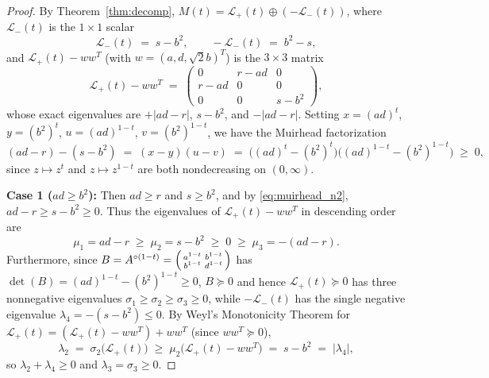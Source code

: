 \documentclass[11pt,a4paper]{article}
\theoremstyle{plain}
\theoremstyle{definition}
\theoremstyle{remark}
\begin{document}
\begin{proof}
By Theorem~\ref{thm:decomp}, $M(t) = \mathcal{L}_+(t) \oplus (-\mathcal{L}_-(t))$, where $\mathcal{L}_-(t)$ is the $1 \times 1$ scalar
\[
  \mathcal{L}_-(t) \;=\; s - b^2, \qquad -\mathcal{L}_-(t) \;=\; b^2 - s,
\]
and $\mathcal{L}_+(t) - w w^T$ (with $w = (a, d, \sqrt{2}b)^T$) is the $3 \times 3$ matrix
\[
  \mathcal{L}_+(t) - w w^T \;=\; \begin{pmatrix} 0 & r - ad & 0 \\ r - ad & 0 & 0 \\ 0 & 0 & s - b^2 \end{pmatrix},
\]
whose exact eigenvalues are $+|ad - r|$, $s - b^2$, and $-|ad - r|$. Setting $x = (ad)^t$, $y = (b^2)^t$, $u = (ad)^{1-t}$, $v = (b^2)^{1-t}$, we have the Muirhead factorization
\begin{equation}\label{eq:muirhead_n2}
  (ad - r) - (s - b^2) \;=\; (x - y)(u - v) \;=\; \big((ad)^t - (b^2)^t\big)\big((ad)^{1-t} - (b^2)^{1-t}\big) \;\ge\; 0,
\end{equation}
since $z \mapsto z^t$ and $z \mapsto z^{1-t}$ are both nondecreasing on $(0,\infty)$.

\textbf{Case 1 ($ad \ge b^2$):} Then $ad \ge r$ and $s \ge b^2$, and by \eqref{eq:muirhead_n2}, $ad - r \ge s - b^2 \ge 0$. Thus the eigenvalues of $\mathcal{L}_+(t) - w w^T$ in descending order are
\[
  \mu_1 = ad - r \;\ge\; \mu_2 = s - b^2 \;\ge\; 0 \;\ge\; \mu_3 = -(ad - r).
\]
Furthermore, since $B = A^{\circ(1-t)} = \begin{psmallmatrix} a^{1-t} & b^{1-t} \\ b^{1-t} & d^{1-t} \end{psmallmatrix}$ has $\det(B) = (ad)^{1-t} - (b^2)^{1-t} \ge 0$, $B \succeq 0$ and hence $\mathcal{L}_+(t) \succeq 0$ has three nonnegative eigenvalues $\sigma_1 \ge \sigma_2 \ge \sigma_3 \ge 0$, while $-\mathcal{L}_-(t)$ has the single negative eigenvalue $\lambda_4 = -(s - b^2) \le 0$. By Weyl's Monotonicity Theorem for $\mathcal{L}_+(t) = (\mathcal{L}_+(t) - w w^T) + w w^T$ (since $w w^T \succeq 0$),
\[
  \lambda_2 \;=\; \sigma_2\big(\mathcal{L}_+(t)\big) \;\ge\; \mu_2\big(\mathcal{L}_+(t) - w w^T\big) \;=\; s - b^2 \;=\; |\lambda_4|,
\]
so $\lambda_2 + \lambda_4 \ge 0$ and $\lambda_3 = \sigma_3 \ge 0$.


\end{proof}
\end{document}
